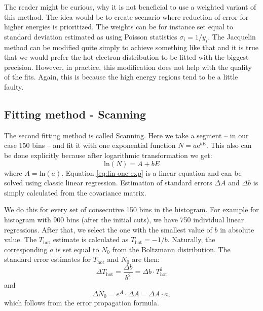 The reader might be curious, why it is not beneficial to use a weighted variant of this method. The idea would be to create scenario where reduction of error for higher energies is prioritized. The weights can be for instance set equal to standard deviation estimated as using Poisson statistics $\sigma_i = 1/y_i$.
The Jacquelin method can be modified quite simply to achieve something like that and it is true that we would prefer the hot electron distribution to be fitted with the biggest precision. However, in practice, this modification does not help with the quality of the fits. Again, this is because the high energy regions tend to be a little faulty.

\subsection*{Fitting method - Scanning}
The second fitting method is called Scanning. Here we take a segment -- in our case 150 bins -- and fit it with one exponential function $N = a\mathrm{e}^{bE}$. This also can be done explicitly because after logarithmic transformation we get:
\begin{equation}
	\label{eq:lin-one-exp}
	\mathrm{ln}(N) = A + bE
\end{equation}
where $A = \mathrm{ln}(a)$. Equation \ref{eq:lin-one-exp} is a linear equation and can be solved using classic linear regression. Estimation of standard errors $\Delta A$ and $\Delta b$ is simply calculated from the covariance matrix.

We do this for every set of consecutive 150 bins in the histogram. For example for histogram with 900 bins (after the initial cuts), we have 750 individual linear regressions. After that, we select the one with the smallest value of $b$ in absolute value. The $T_\mathrm{hot}$ estimate is calculated as $T_\mathrm{hot}=-1/b$. Naturally, the corresponding $a$ is set equal to $N_0$ from the Boltzmann distribution. The standard error estimates for $T_\mathrm{hot}$ and $N_0$ are then:
\begin{equation}
	\Delta T_\mathrm{hot} = \frac{\Delta b}{b^2} =  \Delta b\cdot   T_\mathrm{hot}^2
\end{equation}
and
\begin{equation}
	\Delta N_0 = e^A\cdot \Delta A  =  \Delta A  \cdot a,
\end{equation}
which follows from the error propagation formula.

